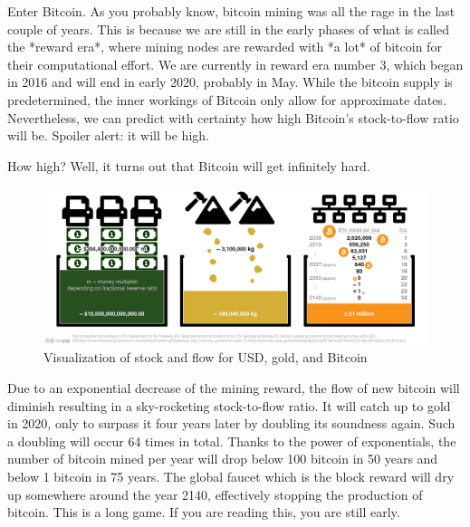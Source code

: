 Enter Bitcoin. As you probably know, bitcoin mining was all the rage in
the last couple of years. This is because we are still in the early
phases of what is called the *reward era*, where mining nodes are
rewarded with *a lot* of bitcoin for their computational effort. We are
currently in reward era number 3, which began in 2016 and will end in
early 2020, probably in May. While the bitcoin supply is predetermined,
the inner workings of Bitcoin only allow for approximate dates.
Nevertheless, we can predict with certainty how high Bitcoin's
stock-to-flow ratio will be. Spoiler alert: it will be high.

How high? Well, it turns out that Bitcoin will get infinitely hard.

\begin{figure}
  \includegraphics{assets/images/stock-to-flow-white-cc-by-sources.png}
  \caption{Visualization of stock and flow for USD, gold, and Bitcoin}
  \label{fig:stock-to-flow-white-cc-by-sources}
\end{figure}

Due to an exponential decrease of the mining reward, the flow of new
bitcoin will diminish resulting in a sky-rocketing stock-to-flow ratio.
It will catch up to gold in 2020, only to surpass it four years later by
doubling its soundness again. Such a doubling will occur 64 times in
total. Thanks to the power of exponentials, the number of bitcoin mined
per year will drop below 100 bitcoin in 50 years and below 1 bitcoin in
75 years. The global faucet which is the block reward will dry up
somewhere around the year 2140, effectively stopping the production of
bitcoin. This is a long game. If you are reading this, you are still
early.

